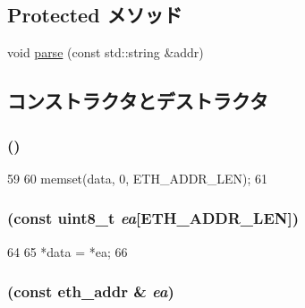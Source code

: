 \subsection*{Protected メソッド}
\begin{DoxyCompactItemize}
\item 
void \hyperlink{structNet_1_1EthAddr_ac5e1557023352646a8f2d30d06025d89}{parse} (const std::string \&addr)
\end{DoxyCompactItemize}


\subsection{コンストラクタとデストラクタ}
\hypertarget{structNet_1_1EthAddr_ace178b96ff6b3ce7b06668bfab519ca7}{
\subsubsection[{EthAddr}]{ ()}}
\label{structNet_1_1EthAddr_ace178b96ff6b3ce7b06668bfab519ca7}



\begin{DoxyCode}
59 {
60     memset(data, 0, ETH_ADDR_LEN);
61 }
\end{DoxyCode}
\hypertarget{structNet_1_1EthAddr_a67062d2e2b567b16e94cbe0d026ca8f6}{
\subsubsection[{EthAddr}]{ (const uint8\_\-t {\em ea}\mbox{[}ETH\_\-ADDR\_\-LEN\mbox{]})}}
\label{structNet_1_1EthAddr_a67062d2e2b567b16e94cbe0d026ca8f6}



\begin{DoxyCode}
64 {
65     *data = *ea;
66 }
\end{DoxyCode}
\hypertarget{structNet_1_1EthAddr_a8cba41ca263992debb1df1cdf1dea37e}{
\subsubsection[{EthAddr}]{ (const eth\_\-addr \& {\em ea})}}
\label{structNet_1_1EthAddr_a8cba41ca263992debb1df1cdf1dea37e}



